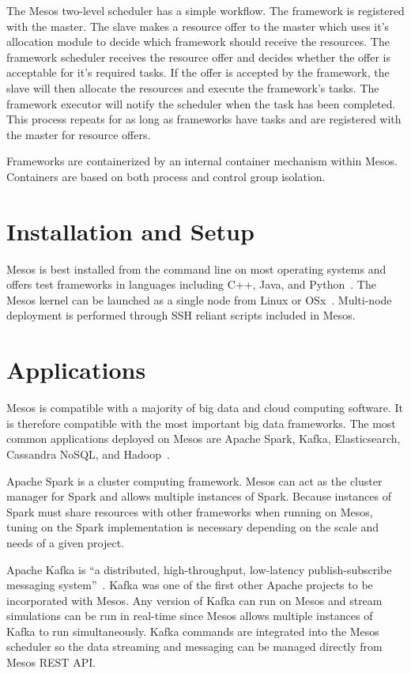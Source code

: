 The Mesos two-level scheduler has a simple workflow. The framework is registered with the master. The slave makes a resource offer to the master which uses it's allocation module to decide which framework should receive the resources. The framework scheduler receives the resource offer and decides whether the offer is acceptable for it's required tasks. If the offer is accepted by the framework, the slave will then allocate the resources and execute the framework's tasks. The framework executor will notify the scheduler when the task has been completed. This process repeats for as long as frameworks have tasks and are registered with the master for resource offers. 

Frameworks are containerized by an internal container mechanism within Mesos. Containers are based on both process and control group isolation. 

\section{Installation and Setup}
Mesos is best installed from the command line on most operating systems and offers test frameworks in languages including C++, Java, and Python~\cite{hid-sp18-404-Kakadia2015}. The Mesos kernel can be launched as a single node from Linux or OSx~\cite{hid-sp18-404-Kakadia2015}. Multi-node deployment is performed through SSH reliant scripts included in Mesos. 


\section{Applications}

Mesos is compatible with a majority of big data and cloud computing software. It is therefore compatible with the most important big data frameworks. The most common applications deployed on Mesos are Apache Spark, Kafka, Elasticsearch, Cassandra NoSQL, and Hadoop~\cite{hid-sp18-404-Yegulalp2016}. 

Apache Spark is a cluster computing framework. Mesos can act as the cluster manager for Spark and allows multiple instances of Spark. Because instances of Spark must share resources with other frameworks when running on Mesos, tuning on the Spark implementation is necessary depending on the scale and needs of a given project. 

Apache Kafka is ``a distributed, high-throughput, low-latency publish-subscribe messaging system''~\cite{hid-sp18-404-Narkhede2015}. Kafka was one of the first other Apache projects to be incorporated with Mesos. Any version of Kafka can run on Mesos and stream simulations can be run in real-time since Mesos allows multiple instances of Kafka to run simultaneously. Kafka commands are integrated into the Mesos scheduler so the data streaming and messaging can be managed directly from Mesos REST API. 


